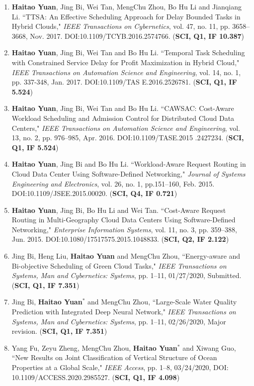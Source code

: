 \documentclass[margin,line]{res}
\begin{document}
\begin{resume}
\begin{enumerate}
\item \textbf{Haitao Yuan}, Jing Bi, Wei Tan, MengChu Zhou, Bo Hu Li and Jianqiang Li. ``TTSA: An Effective Scheduling Approach for Delay Bounded Tasks in Hybrid Clouds," \emph{IEEE Transactions on Cybernetics}, vol. 47, no. 11, pp. 3658--3668, Nov. 2017. DOI:10.1109/TCYB.2016.2574766. (\textbf{SCI, Q1, IF 10.387})
\item \textbf{Haitao Yuan}, Jing Bi, Wei Tan and Bo Hu Li. ``Temporal Task Scheduling with Constrained Service Delay for Profit Maximization in Hybrid Cloud," \emph{IEEE Transactions on Automation Science and Engineering}, vol. 14, no. 1, pp. 337-348, Jan. 2017. DOI:10.1109/TAS E.2016.2526781. (\textbf{SCI, Q1, IF 5.524})
\item \textbf{Haitao Yuan}, Jing Bi, Wei Tan and Bo Hu Li. ``CAWSAC: Cost-Aware Workload Scheduling and Admission Control for Distributed Cloud Data Centers," \emph{IEEE Transactions on Automation Science and Engineering}, vol. 13, no. 2, pp. 976--985, Apr. 2016. DOI:10.1109/TASE.2015 .2427234. (\textbf{SCI, Q1, IF 5.524})
\item \textbf{Haitao Yuan}, Jing Bi and Bo Hu Li. ``Workload-Aware Request Routing in Cloud Data Center Using Software-Defined Networking," \emph{Journal of Systems Engineering and Electronics}, vol. 26, no. 1, pp.151--160, Feb. 2015. DOI:10.1109/JSEE.2015.00020. (\textbf{SCI, Q4, IF 0.721})
\item \textbf{Haitao Yuan}, Jing Bi, Bo Hu Li and Wei Tan. ``Cost-Aware Request Routing in Multi-Geography Cloud Data Centers Using Software-Defined Networking," \emph{Enterprise Information Systems}, vol. 11, no. 3, pp. 359--388, Jun. 2015. DOI:10.1080/17517575.2015.1048833. (\textbf{SCI, Q2, IF 2.122})
\item Jing Bi, Heng Liu, \textbf{Haitao Yuan} and MengChu Zhou, ``Energy-aware and Bi-objective Scheduling of Green Cloud Tasks," \emph{IEEE Transactions on Systems, Man and Cybernetics: Systems}, pp. 1--11, 01/27/2020, Submitted. (\textbf{SCI, Q1, IF 7.351})
\item Jing Bi, \textbf{Haitao Yuan$^{*}$} and MengChu Zhou, ``Large-Scale Water Quality Prediction with Integrated Deep Neural Network," \emph{IEEE Transactions on Systems, Man and Cybernetics: Systems}, pp. 1--11, 02/26/2020, Major revision. (\textbf{SCI, Q1, IF 7.351})
\item Yang Fu, Zeyu Zheng, MengChu Zhou, \textbf{Haitao Yuan$^{*}$} and Xiwang Guo, ``New Results on Joint Classification of Vertical Structure of Ocean Properties at a Global Scale," \emph{IEEE Access}, pp. 1--8, 03/24/2020, DOI: 10.1109/ACCESS.2020.2985527. (\textbf{SCI, Q1, IF 4.098})

\end{enumerate}
\end{resume}
\end{document}
